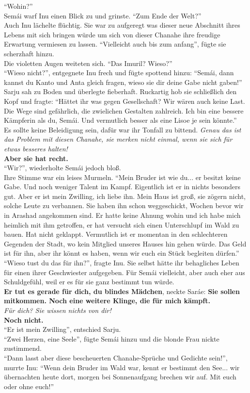 ``Wohin?''\\
Semái warf Inu einen Blick zu und grinste. ``Zum Ende der Welt?''\\
Auch Inu lächelte flüchtig. Sie war zu aufgeregt was dieser neue Abschnitt ihres Lebens mit sich 
bringen würde um sich von dieser Chanahe ihre freudige Erwartung vermiesen zu lassen. ``Vielleicht 
auch bis zum anfang'', fügte sie scherzhaft hinzu.\\
Die violetten Augen weiteten sich. ``Das Imuril? Wieso?''\\
``Wieso nicht?'', entgegnete Inu frech und fügte spottend hinzu: ``Semái, dann kannst du Kanto und 
Anta gleich fragen, wieso sie dir deine Gabe nicht gaben!''\\
Sarju sah zu Boden und überlegte fieberhaft. Ruckartig hob sie schließlich den Kopf und fragte: 
``Hättet ihr was gegen Gesellschaft? Wir wären auch keine Last. Die Wege sind gefährlich, die 
zwielichen Gestalten zahlreich. Ich bin eine bessere Kämpferin als du, Semái. Und vermutlich besser 
als eine Lisoe je sein könnte.''\\
Es sollte keine Beleidigung sein, dafür war ihr Tonfall zu bittend. \textit{Genau das ist das 
Problem mit diesen Chanahe, sie merken nicht einmal, wenn sie sich für etwas besseres halten!}\\
\textbf{Aber sie hat recht.}\\
``Wir?'', wiederholte Semái jedoch bloß.\\
Ihre Stimme war ein leises Murmeln. ``Mein Bruder ist wie du... er besitzt keine Gabe. Und noch 
weniger Talent im Kampf. Eigentlich ist er in nichts besonders gut. Aber er ist mein Zwilling, ich 
liebe ihn. Mein Haus ist groß, sie zögern nicht, solche Leute zu verbannen. Sie haben ihn schon 
weggeschickt, Wochen bevor wir in Arashad angekommen sind. Er hatte keine Ahnung wohin und ich habe 
mich heimlich mit ihm getroffen, er hat versucht sich einen Unterschlupf im Wald zu bauen. Hat 
nicht geklappt. Vermutlich ist er momentan in den schlechteren Gegenden der Stadt, wo kein 
Mitglied unseres Hauses hin gehen würde. Das Geld ist für ihn, aber ihr könnt es haben, wenn wir 
euch ein Stück begleiten dürfen.''\\
``Wieso tust du das für ihn?'', fragte Inu. Sie selbst hätte ihr behagliches Leben für einen ihrer 
Geschwiester aufgegeben. Für Semái vielleicht, aber auch eher aus Schuldgefühl, weil er es für sie 
ganz bestimmt tun würde. \\
\textbf{Er tut es gerade für dich, du blindes Mädchen}, neckte Saráe: \textbf{Sie sollen mitkommen. 
Noch eine weitere Klinge, die für mich kämpft.}\\
\textit{Für dich? Sie wissen nichts von dir!}\\
\textbf{Noch nicht.}\\
``Er ist mein Zwilling'', entschied Sarju.\\
``Zwei Herzen, eine Seele'', fügte Semái hinzu und die blonde Frau nickte zustimmend.\\
``Dann lasst aber diese bescheuerten Chanahe-Sprüche und Gedichte sein!'', murrte Inu: ``Wenn dein 
Bruder im Wald war, kennt er bestimmt den See... wir übernachten heute dort, morgen bei 
Sonnenaufgang brechen wir auf. Mit euch oder ohne euch!''\\